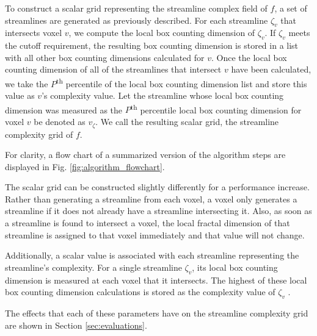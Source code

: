 \documentclass{egpubl}
\begin{document}
To construct a scalar grid representing the streamline complex field of $f$, a set of streamlines are generated as previously described.
For each streamline $\zeta_v$ that intersects voxel $v$, we compute the local box counting dimension of $\zeta_v$.
If $\zeta_v$ meets the cutoff requirement, the resulting box counting dimension is stored in a list with all other box counting dimensions calculated for $v$.
Once the local box counting dimension of all of the streamlines that intersect $v$ have been calculated, we take the $P$\textsuperscript{th} percentile of the local box counting dimension list and store this value as $v$'s complexity value.
Let the streamline whose local box counting dimension was measured as the $P$\textsuperscript{th} percentile local box counting dimension for voxel $v$ be denoted as $v_\zeta$.
We call the resulting scalar grid, the streamline complexity grid of $f$.

For clarity, a flow chart of a summarized version of the algorithm steps are displayed in Fig. \ref{fig:algorithm_flowchart}.

The scalar grid can be constructed slightly differently for a performance increase.
Rather than generating a streamline from each voxel, a voxel only generates a streamline if it does not already have a streamline intersecting it.
Also, as soon as a streamline is found to intersect a voxel, the local fractal dimension of that streamline is assigned to that voxel immediately and that value will not change.

Additionally, a scalar value is associated with each streamline representing the streamline's complexity.
For a single streamline $\zeta_v$, its local box counting dimension is measured at each voxel that it intersects.
The highest of these local box counting dimension calculations is stored as the complexity value of $\zeta_v$ .

The effects that each of these parameters have on the streamline complexity grid are shown in Section \ref{sec:evaluations}.
\end{document}

